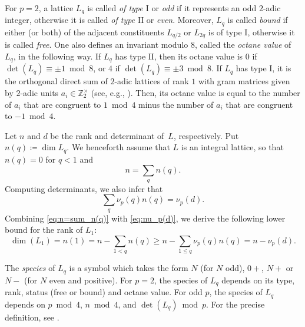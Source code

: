 \documentclass[a4paper]{amsart}
\theoremstyle{definition}
\theoremstyle{plain}
\newcommand{\ZZ}{\mathbb{Z}}
\newcommand{\I}{\mathrm{I}}
\newcommand{\II}{\mathrm{II}}
\begin{document}
For \(p = 2\), a lattice \(L_q\) is called \emph{of type \(\I\)} or \emph{odd} if it represents an odd \(2\)-adic integer, otherwise it is called \emph{of type \(\II\)} or \emph{even}. Moreover, \(L_q\) is called \emph{bound} if either (or both) of the adjacent constituents \(L_{q/2}\) or \(L_{2q}\) is of type \(\I\), otherwise it is called \emph{free}. One also defines an invariant modulo \(8\), called the \emph{octane value} of \(L_q\), in the following way. 
If \(L_q\) has type \(\II\), then its octane value is \(0\) if \(\det(L_q) \equiv \pm 1 \bmod 8\), or \(4\) if \(\det(L_q) \equiv \pm 3 \bmod 8\). 
If \(L_q\) has type \(\I\), it is the orthogonal direct sum of \(2\)-adic lattices of rank $1$ with gram matrices given by \(2\)-adic units \(a_i\in \ZZ_2^\times\) (see, e.g., \cite[Lemma 4.1]{Allcock.Gal.Mark}). Then, its octane value is equal to the number of \(a_i\) that are congruent to \(1 \bmod 4\) minus the number of \(a_i\) that are congruent to \(-1 \bmod 4\). 


Let \(n\) and \(d\) be the rank and determinant of~\(L\), respectively. Put \(n(q) \coloneqq \dim L_q\).
We henceforth assume that \(L\) is an integral lattice, so that \(n(q) = 0\) for \(q < 1\) and 
\begin{equation} \label{eq:n=sum_n(q)}
     n = \sum_q n(q).
\end{equation}
Computing determinants, we also infer that
\begin{equation} \label{eq:nu_p(d)}
    \sum_{q} \nu_p(q) n(q) = \nu_p(d).
\end{equation}
Combining \eqref{eq:n=sum_n(q)} with \eqref{eq:nu_p(d)}, we derive the following lower bound for the rank of \(L_1\):
\begin{equation} \label{eq:n(1)}
    \dim(L_1) = n(1) = n - \sum_{1 < q}n(q) \geq n - \sum_{1 \leq q} \nu_p(q) n(q) = n - \nu_p(d).
\end{equation}

The \emph{species} of \(L_q\) is a symbol which takes the form \(N\) (for \(N\) odd), \(0+\), \(N+\) or \(N-\) (for \(N\) even and positive). For \(p = 2\), the species of \(L_q\) depends on its type, rank, status (free or bound) and octane value. For odd \(p\), the species of \(L_q\) depends on \(p \bmod 4\), \(n \bmod 4\), and \(\det(L_q) \bmod p\). For the precise definition, see \cite[Table~1]{ConwaySloane88}.
\end{document}
